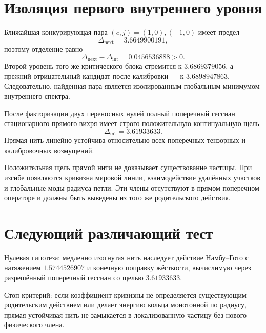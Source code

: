 \section{Изоляция первого внутреннего уровня}

Ближайшая конкурирующая пара $(c,j)=(1,0),(-1,0)$ имеет предел
\begin{equation}
 \Delta_{\mathrm{next}}=3.6649900191,
\end{equation}
поэтому отделение равно
\begin{equation}
 \Delta_{\mathrm{next}}-\Delta_{\mathrm{int}}
 =0.0456536888>0.
\end{equation}
Второй уровень того же критического блока стремится к $3.6869379056$, а
прежний отрицательный кандидат после калибровки --- к $3.6898947863$.
Следовательно, найденная пара является изолированным глобальным минимумом
внутреннего спектра.

\begin{theorem}
После факторизации двух переносных нулей полный поперечный гессиан
стационарного прямого вихря имеет строго положительную континуальную щель
\begin{equation}
 \Delta_{\mathrm{int}}=3.61933633.
\end{equation}
Прямая нить линейно устойчива относительно всех поперечных тензорных и
калибровочных возмущений.
\end{theorem}

\begin{nogocriterion}
Положительная щель прямой нити не доказывает существование частицы. При
изгибе появляются кривизна мировой линии, взаимодействие удалённых участков
и глобальные моды радиуса петли. Эти члены отсутствуют в прямом поперечном
операторе и должны быть выведены из того же родительского действия.
\end{nogocriterion}

\section{Следующий различающий тест}

Нулевая гипотеза: медленно изогнутая нить наследует действие Намбу--Гото с
натяжением $1.5744526907$ и конечную поправку жёсткости, вычислимую через
разрешённый поперечный гессиан со щелью $3.61933633$.

Стоп-критерий: если коэффициент кривизны не определяется существующим
родительским действием или делает энергию кольца монотонной по радиусу,
прямая устойчивая нить не замыкается в локализованную частицу без нового
физического члена.

